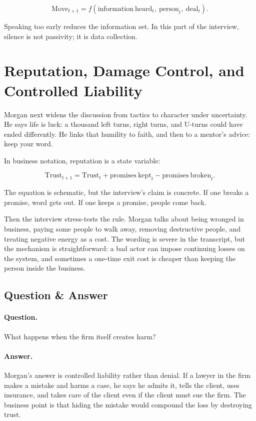 \begin{equation}
\mathrm{Move}_{t+1}
=
f(\mathrm{information\ heard}_{t},\ \mathrm{person}_{t},\ \mathrm{deal}_{t}).
\end{equation}

Speaking too early reduces the information set. In this part of the interview, silence is not passivity; it is data collection.

\section{Reputation, Damage Control, and Controlled Liability}

Morgan next widens the discussion from tactics to character under uncertainty. He says life is luck: a thousand left turns, right turns, and U-turns could have ended differently. He links that humility to faith, and then to a mentor's advice: keep your word.

In business notation, reputation is a state variable:

\begin{equation}
\mathrm{Trust}_{t+1}
=
\mathrm{Trust}_{t}
+
\mathrm{promises\ kept}_{t}
-
\mathrm{promises\ broken}_{t}.
\end{equation}

The equation is schematic, but the interview's claim is concrete. If one breaks a promise, word gets out. If one keeps a promise, people come back.

Then the interview stress-tests the rule. Morgan talks about being wronged in business, paying some people to walk away, removing destructive people, and treating negative energy as a cost. The wording is severe in the transcript, but the mechanism is straightforward: a bad actor can impose continuing losses on the system, and sometimes a one-time exit cost is cheaper than keeping the person inside the business.

\subsection{Question \& Answer}

\paragraph{Question.}
What happens when the firm itself creates harm?

\paragraph{Answer.}
Morgan's answer is controlled liability rather than denial. If a lawyer in the firm makes a mistake and harms a case, he says he admits it, tells the client, uses insurance, and takes care of the client even if the client must sue the firm. The business point is that hiding the mistake would compound the loss by destroying trust.

